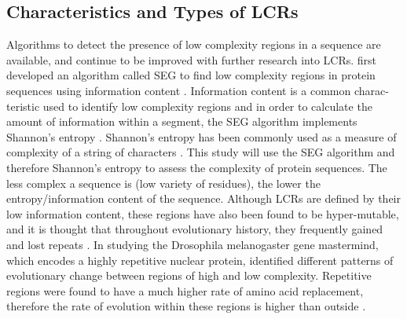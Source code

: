 \documentclass[10pt]{article}
\begin{document}
\subsection{Characteristics and Types of LCRs}
Algorithms to detect the presence of low complexity regions in a sequence are available, and continue to be improved
with further research into LCRs. \citet{wootton1993statistics} first developed an algorithm called SEG to find low complexity
regions in protein sequences using information content \citep{huntley2002simple}. Information content is a common charac-
teristic used to identify low complexity regions and in order to calculate the amount of information within a segment, the SEG
algorithm implements Shannon’s entropy \citep{battistuzzi2016profiles, wootton1993statistics}. Shannon’s entropy \citep{shannon1948mathematical} has been commonly used as a measure of complexity of a string of characters \citep{battistuzzi2016profiles, coletta2010low, wootton1993statistics}. This study will use the SEG algorithm and therefore Shannon’s entropy to assess the complexity of protein sequences. The less complex a sequence is (low variety of residues), the lower the entropy/information content of the sequence. Although LCRs are defined by their low information content, these regions have also been found to be hyper-mutable, and it is thought that throughout evolutionary history, they frequently gained and lost repeats \citep{marcotte1999census, kruglyak1998equilibrium}. In studying the Drosophila melanogaster gene mastermind, which encodes a highly repetitive nuclear protein, \citet{newfeld1991interspecific} identified different patterns of evolutionary change between regions of high and low complexity. Repetitive regions were found to have a much higher rate of amino acid replacement, therefore the rate of evolution within these regions is higher than outside \citep{newfeld1991interspecific, huntley2000evolution}.
\end{document}
